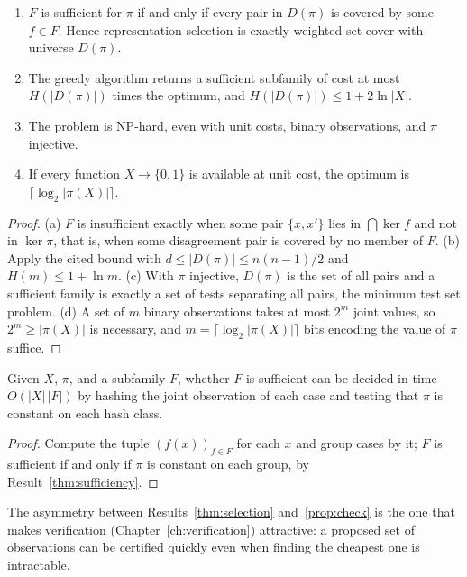 \begin{newresult}\label{thm:selection}
\begin{enumerate}[nosep,label=(\alph*)]
  \item $F$ is sufficient for $\pi$ if and only if every pair in $D(\pi)$ is covered by some $f\in F$. Hence representation selection is exactly weighted set cover with universe $D(\pi)$.
  \item The greedy algorithm returns a sufficient subfamily of cost at most $H(|D(\pi)|)$ times the optimum, and $H(|D(\pi)|)\le1+2\ln|X|$.
  \item The problem is NP-hard, even with unit costs, binary observations, and $\pi$ injective.
  \item If every function $X\to\{0,1\}$ is available at unit cost, the optimum is $\lceil\log_2|\pi(X)|\rceil$.
\end{enumerate}
\end{newresult}
\begin{proof}
(a) $F$ is insufficient exactly when some pair $\{x,x'\}$ lies in $\bigcap\ker f$ and not in $\ker\pi$, that is, when some disagreement pair is covered by no member of $F$. (b) Apply the cited bound with $d\le|D(\pi)|\le n(n-1)/2$ and $H(m)\le1+\ln m$. (c) With $\pi$ injective, $D(\pi)$ is the set of all pairs and a sufficient family is exactly a set of tests separating all pairs, the minimum test set problem. (d) A set of $m$ binary observations takes at most $2^{m}$ joint values, so $2^{m}\ge|\pi(X)|$ is necessary, and $m=\lceil\log_2|\pi(X)|\rceil$ bits encoding the value of $\pi$ suffice.
\end{proof}

\begin{newresult}\label{prop:check}
Given $X$, $\pi$, and a subfamily $F$, whether $F$ is sufficient can be decided in time $O(|X|\,|F|)$ by hashing the joint observation of each case and testing that $\pi$ is constant on each hash class.
\end{newresult}
\begin{proof}
Compute the tuple $(f(x))_{f\in F}$ for each $x$ and group cases by it; $F$ is sufficient if and only if $\pi$ is constant on each group, by Result~\ref{thm:sufficiency}.
\end{proof}

The asymmetry between Results~\ref{thm:selection} and~\ref{prop:check} is the one that makes verification (Chapter~\ref{ch:verification}) attractive: a proposed set of observations can be certified quickly even when finding the cheapest one is intractable.

